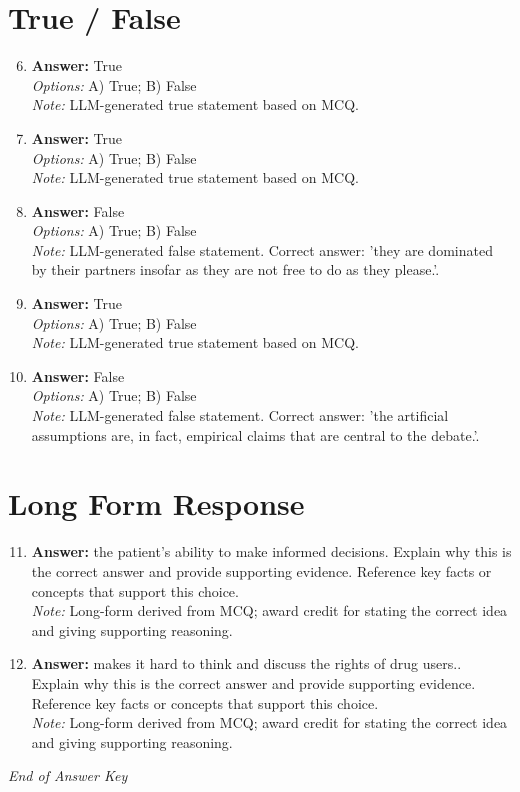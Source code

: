 \documentclass[12pt]{article}
\begin{document}
\section*{True / False}
\begin{enumerate}[label=\arabic*.]
\setcounter{enumi}{5}
\item \textbf{Answer:} True
\\ \textit{Options:} A) True; B) False
\\ \textit{Note:} LLM-generated true statement based on MCQ.
\item \textbf{Answer:} True
\\ \textit{Options:} A) True; B) False
\\ \textit{Note:} LLM-generated true statement based on MCQ.
\item \textbf{Answer:} False
\\ \textit{Options:} A) True; B) False
\\ \textit{Note:} LLM-generated false statement. Correct answer: 'they are dominated by their partners insofar as they are not free to do as they please.'.
\item \textbf{Answer:} True
\\ \textit{Options:} A) True; B) False
\\ \textit{Note:} LLM-generated true statement based on MCQ.
\item \textbf{Answer:} False
\\ \textit{Options:} A) True; B) False
\\ \textit{Note:} LLM-generated false statement. Correct answer: 'the artificial assumptions are, in fact, empirical claims that are central to the debate.'.
\end{enumerate}

\section*{Long Form Response}
\begin{enumerate}[label=\arabic*.]
\setcounter{enumi}{10}
\item \textbf{Answer:} the patient's ability to make informed decisions. Explain why this is the correct answer and provide supporting evidence. Reference key facts or concepts that support this choice.
\\ \textit{Note:} Long-form derived from MCQ; award credit for stating the correct idea and giving supporting reasoning.
\item \textbf{Answer:} makes it hard to think and discuss the rights of drug users.. Explain why this is the correct answer and provide supporting evidence. Reference key facts or concepts that support this choice.
\\ \textit{Note:} Long-form derived from MCQ; award credit for stating the correct idea and giving supporting reasoning.
\end{enumerate}

\vfill
\noindent\textit{End of Answer Key}
\end{document}
